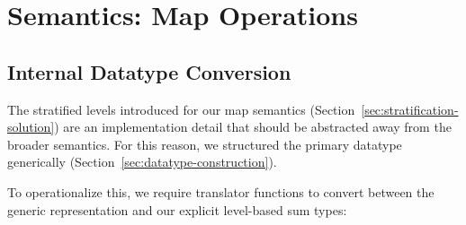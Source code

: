 \section{Semantics: Map Operations}
\subsection{Internal Datatype Conversion}
\label{sec:conversion-internal}

The stratified levels introduced for our map semantics (Section~\ref{sec:stratification-solution}) are an implementation detail that should be abstracted away from the broader semantics.
For this reason, we structured the primary  datatype generically (Section~\ref{sec:datatype-construction}).

To operationalize this, we require translator functions to convert between the generic  representation and our explicit level-based sum types:



